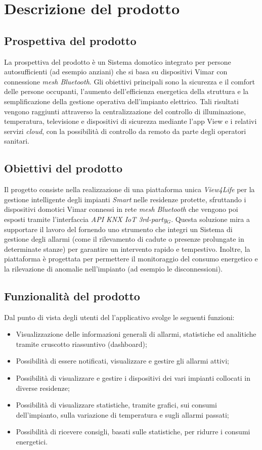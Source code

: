 \documentclass[10pt, letterpaper]{article}
\begin{document}
\section{Descrizione del prodotto}
\subsection{Prospettiva del prodotto}
La prospettiva del prodotto è un Sistema domotico integrato per persone autosufficienti (ad esempio anziani) che si basa su dispositivi
Vimar con connessione \textit{mesh Bluetooth}. Gli obiettivi principali sono la sicurezza e il comfort delle persone occupanti, l'aumento
dell'efficienza energetica della struttura e la semplificazione della gestione operativa dell'impianto elettrico. Tali risultati vengono
raggiunti attraverso la centralizzazione del controllo di illuminazione, temperatura, televisione e dispositivi di sicurezza mediante l'app
View e i relativi servizi \textit{cloud}, con la possibilità di controllo da remoto da parte degli operatori sanitari.

\subsection{Obiettivi del prodotto}{
    Il progetto consiste nella realizzazione di una piattaforma unica \textit{View4Life} per la gestione intelligente degli impianti
    \textit{Smart} nelle residenze protette, sfruttando i dispositivi domotici Vimar connessi in rete \textit{mesh Bluetooth} che
    vengono poi esposti tramite l'interfaccia \textit{API KNX IoT 3rd-party$_{G}$}. Questa soluzione mira a supportare il lavoro del
    \os fornendo uno strumento che integri un Sistema di gestione degli allarmi (come il rilevamento di cadute o presenze prolungate
    in determinate stanze) per garantire un intervento rapido e tempestivo. Inoltre, la piattaforma è progettata per permettere il
    monitoraggio del consumo energetico e la rilevazione di anomalie nell’impianto (ad esempio le disconnessioni).
}

\subsection{Funzionalità del prodotto}
Dal punto di vista degli utenti del \os l'applicativo svolge le seguenti funzioni:
\begin{itemize}
    \item Visualizzazione delle informazioni generali di allarmi, statistiche ed analitiche tramite cruscotto riassuntivo (dashboard);
    \item Possibilità di essere notificati, visualizzare e gestire gli allarmi attivi;
    \item Possibilità di visualizzare e gestire i dispositivi dei vari impianti collocati in diverse residenze;
    \item Possibilità di visualizzare statistiche, tramite grafici, sui consumi dell'impianto, sulla variazione di temperatura e sugli
          allarmi passati;
    \item Possibilità di ricevere consigli, basati sulle statistiche, per ridurre i consumi energetici.
\end{itemize}
\end{document}
